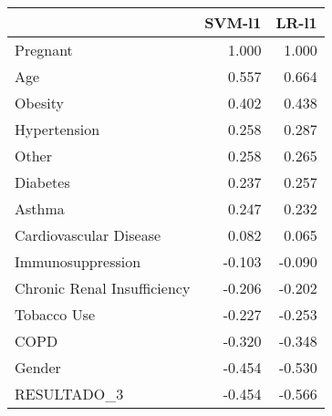 \begin{tabular}{lrr}
\toprule
{} &  SVM-l1 &  LR-l1 \\
\midrule
Pregnant                    &   1.000 &  1.000 \\
Age                         &   0.557 &  0.664 \\
Obesity                     &   0.402 &  0.438 \\
Hypertension                &   0.258 &  0.287 \\
Other                       &   0.258 &  0.265 \\
Diabetes                    &   0.237 &  0.257 \\
Asthma                      &   0.247 &  0.232 \\
Cardiovascular Disease      &   0.082 &  0.065 \\
Immunosuppression           &  -0.103 & -0.090 \\
Chronic Renal Insufficiency &  -0.206 & -0.202 \\
Tobacco Use                 &  -0.227 & -0.253 \\
COPD                        &  -0.320 & -0.348 \\
Gender                      &  -0.454 & -0.530 \\
RESULTADO\_3                 &  -0.454 & -0.566 \\
\bottomrule
\end{tabular}

